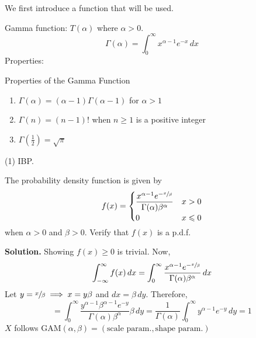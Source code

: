 We first introduce a function that will be used.

Gamma function: $ T(\alpha) $ where $ \alpha>0 $.
\[ \Gamma(\alpha)=\int_{0}^{\infty} x^{\alpha-1}e^{-x}\, d{x}  \]
Properties:
\begin{Proposition}{Properties of the Gamma Function}{}
    \begin{enumerate}[label=(\roman*)]
        \item $ \Gamma(\alpha)=(\alpha-1)\Gamma(\alpha-1) $ for $ \alpha>1 $
        \item $ \Gamma(n)=(n-1)! $ when $ n\geqslant 1 $ is a positive integer
        \item $ \Gamma\left( \frac{1}{2} \right)=\sqrt{\pi} $
    \end{enumerate}
\end{Proposition}
(1) IBP.

\begin{Example}{}{}
    The probability density function is given by
    \[ f(x)=\begin{dcases}
            \frac{x^{\alpha-1}e^{-\sfrac{x}{\beta}}}{\Gamma(\alpha)\beta^\alpha} & x>0          \\
            0                                                                    & x\leqslant 0
        \end{dcases}
    \]
    when $ \alpha>0 $ and $ \beta>0 $. Verify that $ f(x) $
    is a p.d.f.

    \textbf{Solution.} Showing $ f(x)\geqslant 0 $ is trivial. Now,
    \[ \int_{-\infty}^{\infty} f(x)\, d{x} =
        \int_{0}^{\infty} \frac{x^{\alpha-1}e^{-\sfrac{x}{\beta}}}{\Gamma(\alpha)
        \beta^{\alpha}} \, d{x}  \]
    Let $ y=\sfrac{x}{\beta}\implies x=y\beta $ and $ dx=\beta\,dy $.
    Therefore,
    \[ =\int_{0}^{\infty}
        \frac{y^{\alpha-1}\beta^{\alpha-1}e^{-y}}{\Gamma(\alpha)\beta^\alpha}\beta  \, d{y}
        =\frac{1}{\Gamma(\alpha)}\int_{0}^{\infty} y^{\alpha-1}e^{-y}\, d{y}=1    \]
    $ X $ follows $ \text{GAM}(\alpha,\beta)=(\text{scale param.}, \text{shape param.}) $
\end{Example}


